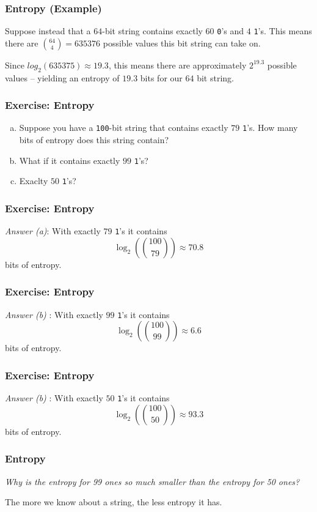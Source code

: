 \documentclass{beamer}
\newcommand{\<}{\langle}
\renewcommand{\>}{\rangle}
\begin{document}
\begin{frame}[fragile]
\frametitle{Entropy (Example)}
Suppose instead that a $64$-bit string contains exactly $60$ \verb|0|'s and $4$ \verb|1|'s. This means there are ${64 \choose 4} = 635376$ possible values this bit string can take on. \newline

Since $log_2(635375) \approx 19.3$, this means there are approximately $2^{19.3}$ possible values -- yielding an entropy of $19.3$ bits for our $64$ bit string.
\end{frame}


\begin{frame}[fragile]
\frametitle{Exercise: Entropy}

\begin{enumerate}[(a)]
\item Suppose you have a \verb|100|-bit string that contains exactly $79$ \verb|1|'s. How many bits of entropy does this string contain? 
\item What if it contains exactly $99$ \verb|1|'s? 
\item Exaclty $50$ \verb|1|'s? 
\end{enumerate}
\end{frame}

\begin{frame}[fragile]
\frametitle{Exercise: Entropy}

\emph{Answer (a)}: With exactly $79$ \verb|1|'s it contains
\[
\log_2\left({100 \choose 79}\right) \approx 70.8
\]
bits of entropy.
\end{frame}

\begin{frame}[fragile]
\frametitle{Exercise: Entropy}
 \emph{Answer (b) }: With exactly $99$ \verb|1|'s it contains
\[
\log_2\left({100 \choose 99}\right) \approx 6.6
\]
bits of entropy.
\end{frame}


\begin{frame}[fragile]
\frametitle{Exercise: Entropy}
 \emph{Answer (b) }: With exactly $50$ \verb|1|'s it contains
\[
\log_2\left({100 \choose 50}\right) \approx 93.3
\]
bits of entropy.
\end{frame}

\begin{frame}
\frametitle{Entropy}

\emph{Why is the entropy for 99 ones so much smaller than the entropy for 50 ones?} \newline \pause

The more we know about a string, the less entropy it has. 
\end{frame}
\end{document}
